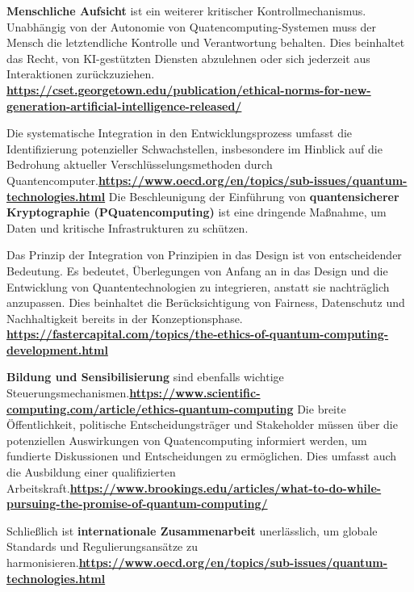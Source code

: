 {\textbf{Menschliche Aufsicht} ist ein weiterer kritischer Kontrollmechanismus. Unabhängig von der Autonomie von Quatencomputing-Systemen muss der Mensch die letztendliche Kontrolle und Verantwortung behalten. Dies beinhaltet das Recht, von KI-gestützten Diensten abzulehnen oder sich jederzeit aus Interaktionen zurückzuziehen. \textbf{\href{https://cset.georgetown.edu/publication/ethical-norms-for-new-generation-artificial-intelligence-released/}{https://cset.georgetown.edu/publication/ethical-norms-for-new-generation-artificial-intelligence-released/}}

Die systematische Integration in den Entwicklungsprozess umfasst die Identifizierung potenzieller Schwachstellen, insbesondere im Hinblick auf die Bedrohung aktueller Verschlüsselungsmethoden durch Quantencomputer.\textbf{\href{https://www.oecd.org/en/topics/sub-issues/quantum-technologies.html}{https://www.oecd.org/en/topics/sub-issues/quantum-technologies.html}} Die Beschleunigung der Einführung von\textbf{ quantensicherer Kryptographie (PQuatencomputing) }ist eine dringende Maßnahme, um Daten und kritische Infrastrukturen zu schützen.

Das Prinzip der Integration von Prinzipien in das Design ist von entscheidender Bedeutung. Es bedeutet, Überlegungen von Anfang an in das Design und die Entwicklung von Quantentechnologien zu integrieren, anstatt sie nachträglich anzupassen. Dies beinhaltet die Berücksichtigung von Fairness, Datenschutz und Nachhaltigkeit bereits in der Konzeptionsphase. \cite{arrow_holistic_2023}
\textbf{\href{https://fastercapital.com/topics/the-ethics-of-quantum-computing-development.html}{https://fastercapital.com/topics/the-ethics-of-quantum-computing-development.html}}

\textbf{Bildung und Sensibilisierung} sind ebenfalls wichtige Steuerungsmechanismen.\textbf{\href{https://www.scientific-computing.com/article/ethics-quantum-computing}{https://www.scientific-computing.com/article/ethics-quantum-computing}} Die breite Öffentlichkeit, politische Entscheidungsträger und Stakeholder müssen über die potenziellen Auswirkungen von Quatencomputing informiert werden, um fundierte Diskussionen und Entscheidungen zu ermöglichen. Dies umfasst auch die Ausbildung einer qualifizierten Arbeitskraft.\textbf{\href{https://www.brookings.edu/articles/what-to-do-while-pursuing-the-promise-of-quantum-computing/}{https://www.brookings.edu/articles/what-to-do-while-pursuing-the-promise-of-quantum-computing/}}

Schließlich ist \textbf{internationale Zusammenarbeit} unerlässlich, um globale Standards und Regulierungsansätze zu harmonisieren.\textbf{\href{https://www.oecd.org/en/topics/sub-issues/quantum-technologies.html}{https://www.oecd.org/en/topics/sub-issues/quantum-technologies.html}}

}
